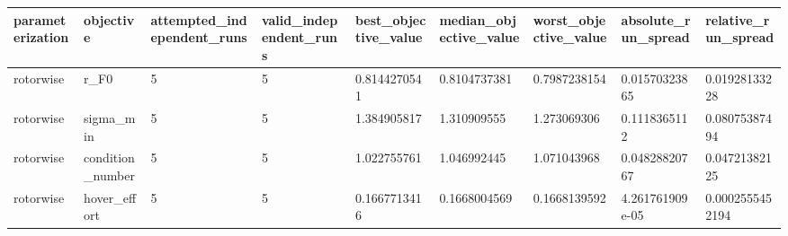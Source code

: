 \begin{tabular}{@{}lllllllll@{}}
\toprule
parameterization & objective & attempted\_independent\_runs & valid\_independent\_runs & best\_objective\_value & median\_objective\_value & worst\_objective\_value & absolute\_run\_spread & relative\_run\_spread \\
\midrule
rotorwise & r\_F0 & 5 & 5 & 0.8144270541 & 0.8104737381 & 0.7987238154 & 0.01570323865 & 0.01928133228 \\
rotorwise & sigma\_min & 5 & 5 & 1.384905817 & 1.310909555 & 1.273069306 & 0.1118365112 & 0.08075387494 \\
rotorwise & condition\_number & 5 & 5 & 1.022755761 & 1.046992445 & 1.071043968 & 0.04828820767 & 0.04721382125 \\
rotorwise & hover\_effort & 5 & 5 & 0.1667713416 & 0.1668004569 & 0.1668139592 & 4.261761909e-05 & 0.0002555452194 \\
\bottomrule
\end{tabular}
